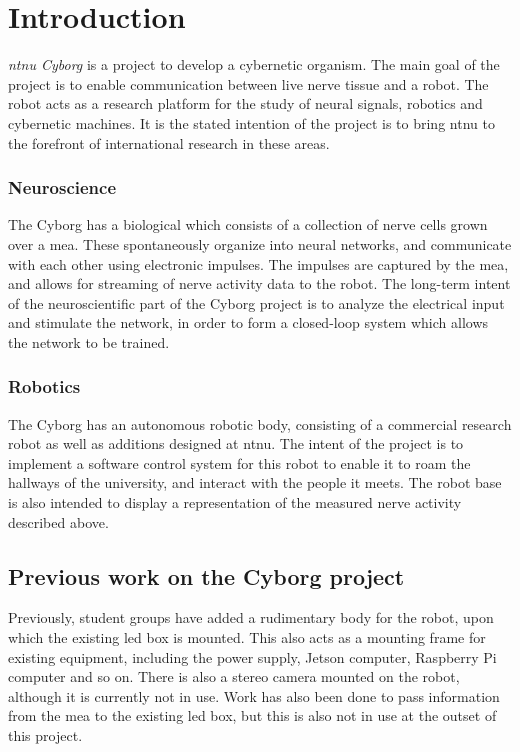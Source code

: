 \documentclass[\rootfolder/main.tex]{subfiles}
\begin{document}
\chapter{Introduction} %
\label{ch:introduction} %

\emph{\acrshort{ntnu} Cyborg} is a project to develop a cybernetic organism.
The main goal of the project is to enable communication between live nerve tissue and a robot.
The robot acts as a research platform for the study of neural signals, robotics and cybernetic machines.  It is the stated intention of the project is to bring \acrshort{ntnu} to the forefront of international research in these areas.

\subsection{Neuroscience}

The Cyborg has a biological  which consists of a collection of nerve cells grown over a \acrfull{mea}.
These spontaneously organize into neural networks, and communicate with each other using electronic impulses.
The impulses are captured by the \acrshort{mea}, and allows for streaming of nerve activity data to the robot.
The long-term intent of the neuroscientific part of the Cyborg project is to analyze the electrical input and stimulate the network, in order to form a closed-loop system which allows the network to be trained.

\subsection{Robotics}

The Cyborg has an autonomous robotic body, consisting of a commercial research robot as well as additions designed at \acrshort{ntnu}.
The intent of the project is to implement a software control system for this robot to enable it to roam the hallways of the university, and interact with the people it meets.
The robot base is also intended to display a representation of the measured nerve activity described above.

\section{Previous work on the Cyborg project}

Previously, student groups have added a rudimentary body for the robot, upon which the existing \acrshort{led} box is mounted.
This also acts as a mounting frame for existing equipment, including the power supply, Jetson computer, Raspberry Pi computer and so on.
There is also a stereo camera mounted on the robot, although it is currently not in use.
Work has also been done to pass information from the \acrlong{mea} to the existing \acrshort{led} box, but this is also not in use at the outset of this project.
\end{document}
